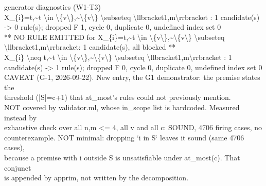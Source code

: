 \documentclass[10pt,a4paper]{article}
\newcommand{\diag}[1]{{\small\itshape\raggedright #1\par}}
\begin{document}
\diag{generator diagnostics (W1-T3)\\{} X\_\{i\}=t,\textasciitilde{}t \textbackslash{}in \textbackslash{}\{v\textbackslash{}\},\textasciitilde{}\textbackslash{}\{v\textbackslash{}\} \textbackslash{}subseteq \textbackslash{}llbracket1,m\textbackslash{}rrbracket : 1 candidate(s) -> 0 rule(s); dropped F 1, cycle 0, duplicate 0, undefined index set 0\\{}   ** NO RULE EMITTED for X\_\{i\}=t,\textasciitilde{}t \textbackslash{}in \textbackslash{}\{v\textbackslash{}\},\textasciitilde{}\textbackslash{}\{v\textbackslash{}\} \textbackslash{}subseteq \textbackslash{}llbracket1,m\textbackslash{}rrbracket: 1 candidate(s), all blocked **\\{} X\_\{i\} \textbackslash{}neq t,\textasciitilde{}t \textbackslash{}in \textbackslash{}\{v\textbackslash{}\},\textasciitilde{}\textbackslash{}\{v\textbackslash{}\} \textbackslash{}subseteq \textbackslash{}llbracket1,m\textbackslash{}rrbracket : 1 candidate(s) -> 1 rule(s); dropped F 0, cycle 0, duplicate 0, undefined index set 0\\{} CAVEAT (G-1, 2026-09-22). New entry, the G1 demonstrator: the premise states the\\{} threshold (|S|=c+1) that at\_most's rules could not previously mention.\\{} NOT covered by validator.ml, whose in\_scope list is hardcoded. Measured instead by\\{} exhaustive check over all n,m <= 4, all v and all c: SOUND, 4706 firing cases, no\\{} counterexample. NOT minimal: dropping `i in S` leaves it sound (same 4706 cases),\\{} because a premise with i outside S is unsatisfiable under at\_most(c). That conjunct\\{} is appended by apprim, not written by the decomposition.}
\end{document}
